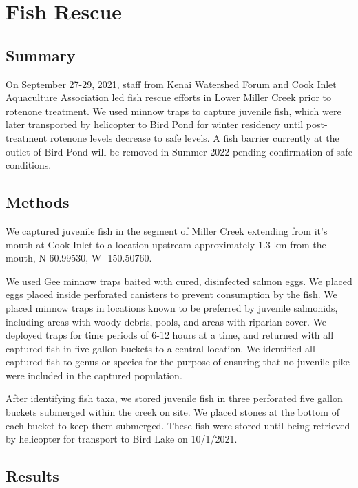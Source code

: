\documentclass[
]{book}
\begin{document}
\hypertarget{fish-rescue}{%
\chapter{Fish Rescue}\label{fish-rescue}}

\hypertarget{summary}{%
\section{Summary}\label{summary}}

On September 27-29, 2021, staff from Kenai Watershed Forum and Cook Inlet Aquaculture Association led fish rescue efforts in Lower Miller Creek prior to rotenone treatment. We used minnow traps to capture juvenile fish, which were later transported by helicopter to Bird Pond for winter residency until post-treatment rotenone levels decrease to safe levels. A fish barrier currently at the outlet of Bird Pond will be removed in Summer 2022 pending confirmation of safe conditions.

\hypertarget{methods-1}{%
\section{Methods}\label{methods-1}}

We captured juvenile fish in the segment of Miller Creek extending from it's mouth at Cook Inlet to a location upstream approximately 1.3 km from the mouth, N 60.99530, W -150.50760.

We used Gee minnow traps baited with cured, disinfected salmon eggs. We placed eggs placed inside perforated canisters to prevent consumption by the fish. We placed minnow traps in locations known to be preferred by juvenile salmonids, including areas with woody debris, pools, and areas with riparian cover. We deployed traps for time periods of 6-12 hours at a time, and returned with all captured fish in five-gallon buckets to a central location. We identified all captured fish to genus or species for the purpose of ensuring that no juvenile pike were included in the captured population.

After identifying fish taxa, we stored juvenile fish in three perforated five gallon buckets submerged within the creek on site. We placed stones at the bottom of each bucket to keep them submerged. These fish were stored until being retrieved by helicopter for transport to Bird Lake on 10/1/2021.

\hypertarget{results-1}{%
\section{Results}\label{results-1}}
\end{document}
